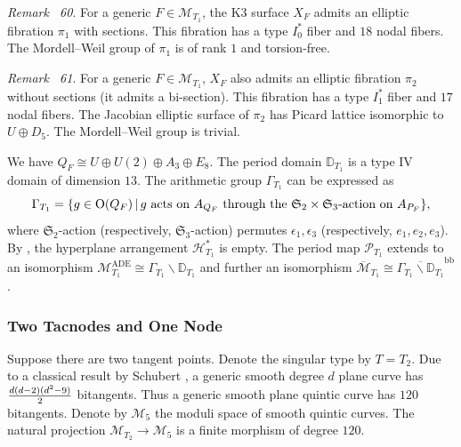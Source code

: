 \documentclass[
]{article}
\begin{document}
\emph{Remark~ 60}. For a generic \(F\in\mathcal{M}_{T_1}\), the K3
surface \(X_F\) admits an elliptic fibration \(\pi_1\) with sections.
This fibration has a type \(I_0^*\) fiber and \(18\) nodal fibers. The
Mordell--Weil group of \(\pi_1\) is of rank \(1\) and torsion-free.

\emph{Remark~ 61}. For a generic \(F\in\mathcal{M}_{T_1}\), \(X_F\) also
admits an elliptic fibration \(\pi_2\) without sections (it admits a
bi-section). This fibration has a type \(I_1^*\) fiber and \(17\) nodal
fibers. The Jacobian elliptic surface of \(\pi_2\) has Picard lattice
isomorphic to \(U\oplus D_5\). The Mordell--Weil group is trivial.

We have \(Q_F\cong U\oplus U(2)\oplus A_3\oplus E_8\). The period domain
\(\mathbb{D}_{T_1}\) is a type IV domain of dimension \(13\). The
arithmetic group \(\Gamma_{T_1}\) can be expressed as
\[\Gamma_{T_1} = \{ g\in\mathrm{O}(Q_F) \,|\, g \textup{ acts on } A_{Q_F} \textup{ through the } \mathfrak{S}_2\times\mathfrak{S}_3\textup{-action on } A_{P_F} \},\]
where \(\mathfrak{S}_2\)-action (respectively,
\(\mathfrak{S}_3\)-action) permutes \(\epsilon_1,\epsilon_3\)
(respectively, \(e_1,e_2,e_3\)). By
\cite[Proposition 3.7]{yu2023moduli}, the hyperplane arrangement
\(\mathcal{H}_{T_1}^*\) is empty. The period map \(\mathscr{P}_{T_1}\)
extends to an isomorphism
\(\mathcal{M}_{T_1}^{\mathrm{ADE}}\cong\Gamma_{T_1}\backslash\mathbb{D}_{T_1}\)
and further an isomorphism
\(\overline{\mathcal{M}}_{T_1}\cong \overline{\Gamma_{T_1}\backslash\mathbb{D}_{T_1}}^{\mathrm{bb}}\).

\subsubsection{Two Tacnodes and One
Node}\label{two-tacnodes-and-one-node}

Suppose there are two tangent points. Denote the singular type by
\(T=T_2\). Due to a classical result by Schubert
\cite{schubert1879kalkul}, a generic smooth degree \(d\) plane curve has
\(d(d-2)(d^2-9)\over2\) bitangents. Thus a generic smooth plane quintic
curve has \(120\) bitangents. Denote by \(\mathcal{M}_5\) the moduli
space of smooth quintic curves. The natural projection
\(\mathcal{M}_{T_2}\to \mathcal{M}_5\) is a finite morphism of degree
\(120\).
\end{document}
